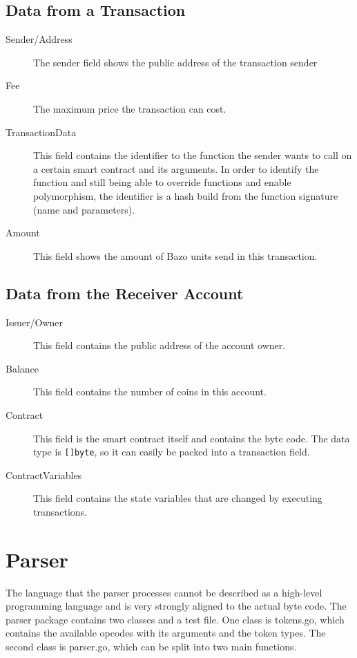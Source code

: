 \subsection{Data from a Transaction}
\begin{description}
  \item[Sender/Address] The sender field shows the public address of the transaction sender 
  \item[Fee] The maximum price the transaction can cost.
  \item[TransactionData] This field contains the identifier to the function the sender wants to call on a certain smart contract and its arguments. In order to identify the function and still being able to override functions and enable polymorphism, the identifier is a hash build from the function signature (name and parameters).
  \item[Amount] This field shows the amount of Bazo units send in this transaction.
\end{description}

\subsection{Data from the Receiver Account}
\begin{description}
  \item[Issuer/Owner] This field contains the public address of the account owner.
  \item[Balance] This field contains the number of coins in this account.
  \item[Contract] This field is the smart contract itself and contains the byte code. The data type is \texttt{[]byte}, so it can easily be packed into a transaction field.
  \item[ContractVariables] This field contains the state variables that are changed by executing transactions.
\end{description}

\section{Parser}
The language that the parser processes cannot be described as a high-level programming language and is very strongly aligned to the actual byte code. The parser package contains two classes and a test file. One class is tokens.go, which contains the available opcodes with its arguments and the token types. The second class is parser.go, which can be split into two main functions.

